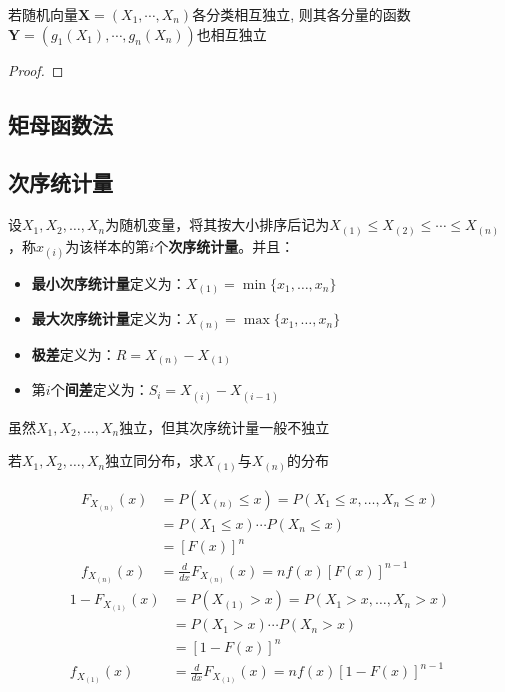 \begin{proposition}
    若随机向量$\mathbf{X}=(X_1,\cdots ,X_n)$各分类相互独立, 则其各分量的函数$\mathbf{Y}=(g_1(X_1),\cdots ,g_n(X_n))$也相互独立
\end{proposition}
\begin{proof}

\end{proof}

\subsection{矩母函数法}

\subsection{次序统计量}

\begin{definition}
    设$X_1,X_2,\dotsc,X_n$为随机变量，将其按大小排序后记为$X_{(1)}\le X_{(2)} \le  \cdots \le X_{(n)}$，称$x_{(i)}$为该样本的第$i$个\textbf{次序统计量}。并且：
    \begin{itemize}
        \item \textbf{最小次序统计量}定义为：$X_{(1)}=\min\{x_1,\dotsc,x_n\}$
        \item \textbf{最大次序统计量}定义为：$X_{(n)}=\max\{x_1,\dotsc,x_n\}$
        \item \textbf{极差}定义为：$R=X_{(n)}-X_{(1)}$
        \item 第$i$个\textbf{间差}定义为：$S_i=X_{(i)}-X_{(i-1)}$
    \end{itemize}
\end{definition}

\begin{remark}
    虽然$X_1,X_2,\dotsc,X_n$独立，但其次序统计量一般不独立
\end{remark}

\begin{example}
    若$X_1,X_2,\dotsc,X_n$独立同分布，求$X_{(1)}$与$X_{(n)}$的分布
\end{example}
\begin{solution}
    \begin{align*}
        F_{X_{(n)}}(x) & =P(X_{(n)} \le x)=P(X_1 \le x, \ldots, X_n \le x) \\
                       & =P(X_1 \le x) \cdots P(X_n \le x)                 \\
                       & =[F(x)]^n                                         \\
        f_{X_{(n)}}(x) & = \frac{d}{dx}F_{X_{(n)}}(x) =nf(x)[F(x)]^{n-1}
    \end{align*}
    \begin{align*}
        1-F_{X_{(1)}}(x) & =P(X_{(1)}>x)=P(X_1>x, \ldots, X_n>x)             \\
                         & =P(X_1>x)\cdots P(X_n>x)                          \\
                         & =[1-F(x)]^n                                       \\
        f_{X_{(1)}}(x)   & = \frac{d}{dx}F_{X_{(1)}}(x) =nf(x)[1-F(x)]^{n-1}
    \end{align*}
\end{solution}

